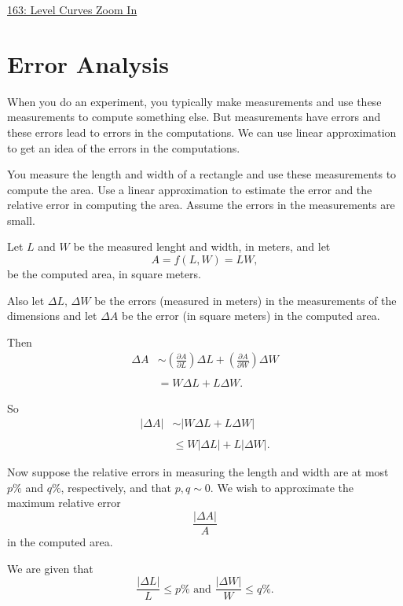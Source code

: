 \documentclass{ximera}
\begin{document}
\href{https://www.desmos.com/calculator/8hphbdetoj}{163: Level Curves Zoom In}


\section{Error Analysis}
When you do an experiment, you typically make measurements and use these measurements to compute something else. But measurements have errors and these errors lead to errors in the computations. We can use linear approximation to get an idea of the errors in the computations.

\begin{example}  \label{Edstrt4th}
You measure the length and width of a rectangle and use these measurements to compute the area. Use a linear approximation to estimate the error and the relative error in computing the area. Assume the errors in the measurements are small.

\begin{explanation}
Let $L$ and $W$ be the measured lenght and width, in meters, and let
\[
  A =f(L,W) = LW ,
\]
be the computed area, in square meters. 

Also let $\Delta L$, $\Delta W$ be the errors (measured in meters) in the measurements of the dimensions and let $\Delta A$ be the error (in square meters) in the computed area.

Then
\begin{align*}
   \Delta A  &\sim  \left( \frac{\partial A}{\partial L} \right) \Delta L + \left( \frac{\partial A}{\partial W} \right)  \Delta W \\ \\
                &=  W\Delta L +  L \Delta W .
\end{align*}

So
\begin{align*}
    | \Delta A |  &\sim |   W\Delta L +  L \Delta W | \\ \\
                      & \leq W|\Delta L| + L |\Delta W| .
\end{align*}

Now suppose the relative errors in measuring the length and width are at most $p\%$ and $q\%$, respectively, and that $p,q \sim 0$.  We wish to approximate the maximum relative error
\[
      \frac{|\Delta A|}{A}
\]
in the computed area.

We are given that 
\[
      \frac{|\Delta L|}{L} \leq p\% \text{ and } \frac{|\Delta W|}{W} \leq q\% .
\]


\end{explanation}
\end{example}
\end{document}
